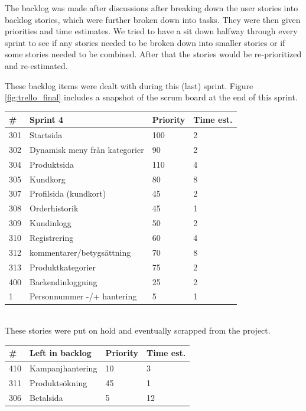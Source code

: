 \documentclass[paper=a4, fontsize=11pt]{report} %
\begin{document}
	The backlog was made after discussions after breaking down the user stories
	into backlog stories, which were further broken down into tasks. They were
	then given priorities and time estimates. We tried to have a sit down halfway
	through every sprint to see if any stories needed to be broken down into
	smaller stories or if some stories needed to be combined. After that the
	stories would be re-prioritized and re-estimated.

	These backlog items were dealt with during this (last) sprint.
	Figure \ref{fig:trello_final} includes a snapshot of the scrum board
	at the end of this sprint. \\

	\begin{tabular}{|l|l|l|l|}
		\hline
		\#  & Sprint 4                      & Priority & Time est. \\ \hline
		301 & Startsida                     & 100      & 2         \\ \hline
		302 & Dynamisk meny från kategorier & 90       & 2         \\ \hline
		304 & Produktsida                   & 110      & 4         \\ \hline
		305 & Kundkorg                      & 80       & 8         \\ \hline
		307 & Profilsida (kundkort)         & 45       & 2         \\ \hline
		308 & Orderhistorik                 & 45       & 1         \\ \hline
		309 & Kundinlogg                    & 50       & 2         \\ \hline
		310 & Registrering                  & 60       & 4         \\ \hline
		312 & kommentarer/betygsättning     & 70       & 8         \\ \hline
		313 & Produktkategorier             & 75       & 2         \\ \hline
		400 & Backendinloggning             & 25       & 2         \\ \hline
		1   & Personnummer -/+ hantering    & 5        & 1         \\ \hline
	\end{tabular} \\


	These stories were put on hold and eventually scrapped from the project.

	\begin{tabular}{|l|l|l|l|}
		\hline
		\#  & Left in backlog  & Priority & Time est. \\ \hline
		410 & Kampanjhantering & 10       & 3         \\ \hline
		311 & Produktsökning   & 45       & 1         \\ \hline
		306 & Betalsida        & 5        & 12        \\ \hline
	\end{tabular}
\end{document}
